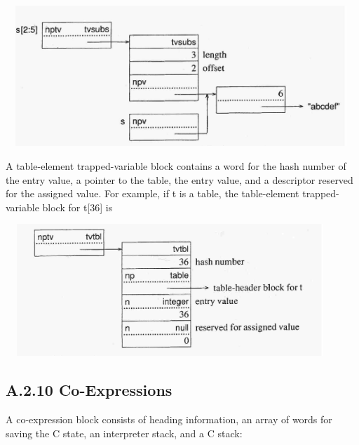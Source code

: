 \ \  \includegraphics[width=4.9161in,height=2.0866in]{ib-img/ib-img128.jpg} 


A table-element trapped-variable block contains a word for the hash
number of the entry value, a pointer to the table, the entry value,
and a descriptor reserved for the assigned value. For example, if t is
a table, the table-element trapped-variable block for t[36] is


\ \  \includegraphics[width=4.5953in,height=1.9571in]{ib-img/ib-img129.jpg} 

\subsection{A.2.10 Co-Expressions}

A co-expression block consists of heading information, an array of
words for saving the C state, an interpreter stack, and a C stack:

\clearpage
\bigskip


